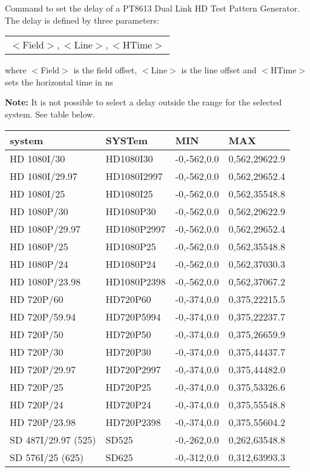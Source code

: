 Command to set the delay of a PT8613 Dual Link HD Test Pattern Generator. The delay is defined by three parameters:

\begin{tabular}{l}
$<$Field$>,<$Line$>,<$HTime$>$
\end{tabular}

where $<$Field$>$ is the field offset, $<$Line$>$ is the line offset and $<$HTime$>$ sets the horizontal time in ns

\textbf{Note:} It is not possible to select a delay outside the range for the selected system.  See table below.

\begin{tabular}{|l|l|l|l|}
\hline
system         &     SYSTem     &     MIN      &       MAX\\
\hline
HD 1080I/30        &  HD1080I30    & -0,-562,0.0 & 0,562,29622.9\\
HD 1080I/29.97     &  HD1080I2997  & -0,-562,0.0 & 0,562,29652.4\\
HD 1080I/25        &  HD1080I25    & -0,-562,0.0 & 0,562,35548.8\\
HD 1080P/30        &  HD1080P30    & -0,-562,0.0 & 0,562,29622.9\\
HD 1080P/29.97     &  HD1080P2997  & -0,-562,0.0 & 0,562,29652.4\\
HD 1080P/25        &  HD1080P25    & -0,-562,0.0 & 0,562,35548.8\\
HD 1080P/24        &  HD1080P24    & -0,-562,0.0 & 0,562,37030.3\\
HD 1080P/23.98     &  HD1080P2398  & -0,-562,0.0 & 0,562,37067.2\\
HD 720P/60         &  HD720P60     & -0,-374,0.0 & 0,375,22215.5\\
HD 720P/59.94      &  HD720P5994   & -0,-374,0.0 & 0,375,22237.7\\
HD 720P/50         &  HD720P50     & -0,-374,0.0 & 0,375,26659.9\\
HD 720P/30         &  HD720P30     & -0,-374,0.0 & 0,375,44437.7\\
HD 720P/29.97      &  HD720P2997   & -0,-374,0.0 & 0,375,44482.0\\
HD 720P/25         &  HD720P25     & -0,-374,0.0 & 0,375,53326.6\\
HD 720P/24         &  HD720P24     & -0,-374,0.0 & 0,375,55548.8\\
HD 720P/23.98      &  HD720P2398   & -0,-374,0.0 & 0,375,55604.2\\
SD 487I/29.97 (525)&  SD525        & -0,-262,0.0 & 0,262,63548.8\\
SD 576I/25 (625)   &  SD625        & -0,-312,0.0 & 0,312,63993.3\\
\hline
\end{tabular}


